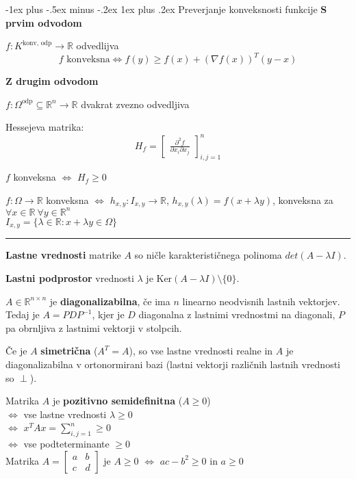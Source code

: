 \documentclass[a4paper,8pt]{extarticle}
\makeatletter
\renewcommand{\subsubsection}{\@startsection{subsubsection}{3}{0mm}%
                                {-1ex plus -.5ex minus -.2ex}%
                                {1ex plus .2ex}%
                                {\normalfont\small\bfseries}}
\makeatother
\begin{document}
\begin{multicols}{4}
\subsubsection{Preverjanje konveksnosti funkcije}
\textbf{S prvim odvodom}

$f: K^{\text{konv, odp}} \to \mathbb{R}$ odvedlijva
\[ f \text{ konveksna} \iff f(y) \geq f(x) + \left(\nabla f(x)\right)^T(y-x)\]

\textbf{Z drugim odvodom}

$f: \Omega^{\text{odp}} \subseteq \mathbb{R}^n \to \mathbb{R}$ dvakrat zvezno odvedljiva

Hessejeva matrika:
\[H_f = \begin{bmatrix}
	\frac{\partial^2 f}{\partial x_i \partial x_j}
\end{bmatrix}_{i,j = 1}^n\]

$f$ konveksna $\iff$ $H_f \geq 0$

$f: \Omega \to \mathbb{R}$ konveksna $\iff$ $h_{x,y}:I_{x,y} \to \mathbb{R}$, $h_{x,y}(\lambda) = f(x+\lambda y)$, konveksna za $\forall x \in \mathbb{R}\ \forall y \in \mathbb{R}^n$\\
$I_{x,y} = \{\lambda \in \mathbb{R} : x+\lambda y \in \Omega\}$

\noindent\rule{2cm}{0.4pt}

\textbf{Lastne vrednosti} matrike $A$ so ničle karakterističnega polinoma $det(A - \lambda I)$.

\textbf{Lastni podprostor} vrednosti $\lambda$ je $\text{Ker}(A-\lambda I) \setminus \{0\}$.

$A \in \mathbb{R}^{n\times n}$ je \textbf{diagonalizabilna}, če ima $n$ linearno neodvisnih lastnih vektorjev. Tedaj je $A = PDP^{-1}$, kjer je $D$ diagonalna z lastnimi vrednostmi na diagonali, $P$ pa obrnljiva z lastnimi vektorji v stolpcih.

Če je $A$ \textbf{simetrična} ($A^T = A$), so vse lastne vrednosti realne in $A$ je diagonalizabilna v ortonormirani bazi (lastni vektorji različnih lastnih vrednosti so $\perp$).

Matrika $A$ je \textbf{pozitivno semidefinitna} ($A \geq 0$) \\
$\iff$ vse lastne vrednosti $\lambda \geq 0$ \\
$\iff$ $x^T A x = \sum_{i,j = 1}^n \geq 0$ \\
$\iff$ vse podteterminante $\geq 0$ \\

Matrika $A = \begin{bmatrix}
	a & b \\
	c & d
\end{bmatrix}$ je $A \geq 0$ $\iff$ $ac - b^2 \geq 0$ in $a \geq 0$

\end{multicols}
\end{document}
